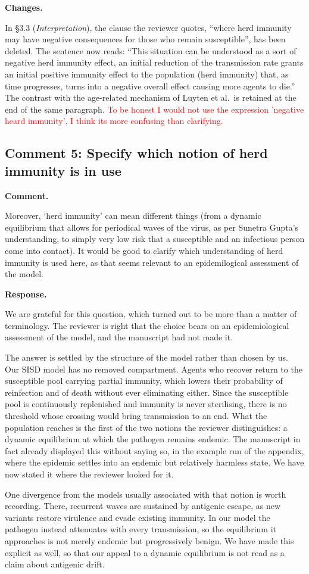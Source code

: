 \documentclass[a4paper,12pt]{article}
\newcommand{\ignacio}[1]{\textcolor{red}{#1}}
\newcommand{\reply}[1]{#1}
\newcommand{\rlabel}[1]{\par\medskip\noindent\textbf{#1}\par\nobreak}
\begin{document}
\rlabel{Changes.}
\reply{In \S3.3 (\emph{Interpretation}), the clause the reviewer quotes,
``where herd immunity may have negative consequences for those who remain
susceptible'', has been deleted. The sentence now reads: ``This situation can be
understood as a sort of negative herd immunity effect, an initial reduction of
the transmission rate grants an initial positive immunity effect to the
population (herd immunity) that, as time progresses, turns into a negative
overall effect causing more agents to die.'' The contrast with the age-related
mechanism of Luyten et al.\ is retained at the end of the same paragraph.} \ignacio{To be honest I would not use the expression 'negative heard immunity', I think its more confusing than clarifying.}

\subsection*{Comment 5: Specify which notion of herd immunity is in use}

\rlabel{Comment.}
Moreover, `herd immunity' can mean different things (from a dynamic equilibrium that allows for periodical waves of the virus, as per Sunetra Gupta's understanding, to simply very low risk that a susceptible and an infectious person come into contact). It would be good to clarify which understanding of herd immunity is used here, as that seems relevant to an epidemilogical assessment of the model.

\rlabel{Response.}
\reply{We are grateful for this question, which turned out to be more than a
matter of terminology. The reviewer is right that the choice bears on an
epidemiological assessment of the model, and the manuscript had not made it.

The answer is settled by the structure of the model rather than chosen by us.
Our SISD model has no removed compartment. Agents who recover return to the
susceptible pool carrying partial immunity, which lowers their probability of
reinfection and of death without ever eliminating either. Since the
susceptible pool is continuously replenished and immunity is never sterilising,
there is no threshold whose crossing would bring transmission to an end. What
the population reaches is the first of the two notions the reviewer
distinguishes: a dynamic equilibrium at which the pathogen remains endemic.
The manuscript in fact already displayed this without saying so, in the example
run of the appendix, where the epidemic settles into an endemic but relatively
harmless state. We have now stated it where the reviewer looked for it.

One divergence from the models usually associated with that notion is worth
recording. There, recurrent waves are sustained by antigenic escape, as new
variants restore virulence and evade existing immunity. In our model the
pathogen instead attenuates with every transmission, so the equilibrium it
approaches is not merely endemic but progressively benign. We have made this
explicit as well, so that our appeal to a dynamic equilibrium is not read as a
claim about antigenic drift.}
\end{document}
